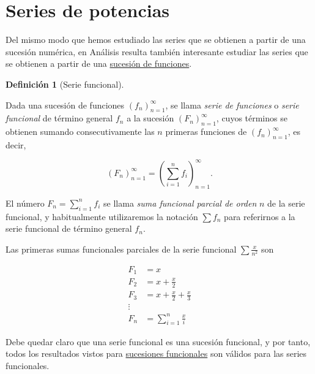 \documentclass[
  a4paper,
]{scrreport}
\theoremstyle{plain}
\theoremstyle{plain}
\theoremstyle{definition}
\newtheorem{definition}{Definición}[chapter]
\theoremstyle{definition}
\theoremstyle{plain}
\theoremstyle{remark}
\begin{document}
\hypertarget{series-de-potencias}{%
\section{Series de potencias}\label{series-de-potencias}}

Del mismo modo que hemos estudiado las series que se obtienen a partir
de una sucesión numérica, en Análisis resulta también interesante
estudiar las series que se obtienen a partir de una
\protect\hyperlink{sucesiones-de-funciones}{sucesión de funciones}.

\leavevmode{}%
\begin{definition}[Serie funcional]\label{def-serie-funcional}

Dada una sucesión de funciones \((f_n)_{n=1}^\infty\), se llama
\emph{serie de funciones} o \emph{serie funcional} de término general
\(f_n\) a la sucesión \((F_n)_{n=1}^\infty\), cuyos términos se obtienen
sumando consecutivamente las \(n\) primeras funciones de
\((f_n)_{n=1}^\infty\), es decir,

\[
(F_n)_{n=1}^\infty= \left(\sum_{i=1}^nf_i\right)_{n=1}^\infty.
\]

El número \(F_n=\sum_{i=1}^n f_i\) se llama \emph{suma funcional parcial
de orden} \(n\) de la serie funcional, y habitualmente utilizaremos la
notación \(\sum f_n\) para referirnos a la serie funcional de término
general \(f_n\).

\end{definition}

\leavevmode{}%
Las primeras sumas funcionales parciales de la serie funcional
\(\sum \frac{x}{n^2}\) son

\begin{align*}
F_1 &= x\\
F_2 &= x+\frac{x}{2}\\ 
F_3 &= x+\frac{x}{2}+\frac{x}{3}\\ 
\vdots\\ 
F_n &= \sum_{i=1}^n \frac{x}{i}
\end{align*}

\begin{tcolorbox}[enhanced jigsaw, breakable, bottomrule=.15mm, coltitle=black, bottomtitle=1mm, opacityback=0, title=\textcolor{quarto-callout-important-color}{\faExclamation}\hspace{0.5em}{Importante}, left=2mm, toptitle=1mm, toprule=.15mm, opacitybacktitle=0.6, colframe=quarto-callout-important-color-frame, arc=.35mm, colback=white, rightrule=.15mm, titlerule=0mm, leftrule=.75mm, colbacktitle=quarto-callout-important-color!10!white]

Debe quedar claro que una serie funcional es una sucesión funcional, y
por tanto, todos los resultados vistos para
\protect\hyperlink{sucesiones-de-funciones}{sucesiones funcionales} son
válidos para las series funcionales.

\end{tcolorbox}
\end{document}

